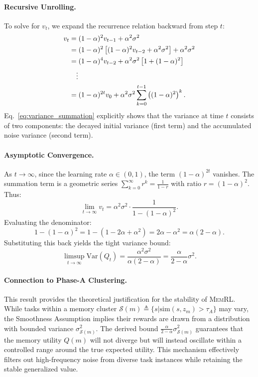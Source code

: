 \documentclass{article}
\theoremstyle{plain}
\theoremstyle{definition}
\theoremstyle{remark}
\begin{document}
\paragraph{Recursive Unrolling.}
To solve for $v_t$, we expand the recurrence relation backward from step $t$:
\begin{align}
    v_t &= (1-\alpha)^2 v_{t-1} + \alpha^2 \sigma^2 \notag \\
    &= (1-\alpha)^2 \left[ (1-\alpha)^2 v_{t-2} + \alpha^2 \sigma^2 \right] + \alpha^2 \sigma^2 \notag \\
    &= (1-\alpha)^4 v_{t-2} + \alpha^2 \sigma^2 \left[ 1 + (1-\alpha)^2 \right] \notag \\
    &\quad \vdots \nonumber \\
    &= (1-\alpha)^{2t} v_0 + \alpha^2 \sigma^2 \sum_{k=0}^{t-1} \left( (1-\alpha)^2 \right)^k. \label{eq:variance_summation}
\end{align}
Eq.~\ref{eq:variance_summation} explicitly shows that the variance at time $t$ consists of two components: the decayed initial variance (first term) and the accumulated noise variance (second term).

\paragraph{Asymptotic Convergence.}
As $t \to \infty$, since the learning rate $\alpha \in (0,1)$, the term $(1-\alpha)^{2t}$ vanishes. The summation term is a geometric series $\sum_{k=0}^{\infty} r^k = \frac{1}{1-r}$ with ratio $r = (1-\alpha)^2$. Thus:
\begin{equation*}
    \lim_{t \to \infty} v_t 
    = \alpha^2 \sigma^2 \cdot \frac{1}{1 - (1-\alpha)^2}.
\end{equation*}
Evaluating the denominator:
\begin{equation*}
    1 - (1-\alpha)^2 = 1 - (1 - 2\alpha + \alpha^2) = 2\alpha - \alpha^2 = \alpha(2-\alpha).
\end{equation*}
Substituting this back yields the tight variance bound:
\begin{equation}
    \limsup_{t \to \infty} \mathrm{Var}(Q_t) 
    = \frac{\alpha^2 \sigma^2}{\alpha(2-\alpha)} 
    = \frac{\alpha}{2-\alpha} \sigma^2.
\end{equation}

\paragraph{Connection to Phase-A Clustering.}
This result provides the theoretical justification for the stability of \textsc{MemRL}. While tasks within a memory cluster $\mathcal{S}(m) \triangleq \{ s | \text{sim}(s, z_m) > \tau_A \}$ may vary, the Smoothness Assumption implies their rewards are drawn from a distribution with bounded variance $\sigma^2_{\mathcal{S}(m)}$.
The derived bound $\frac{\alpha}{2-\alpha} \sigma^2_{\mathcal{S}(m)}$ guarantees that the memory utility $Q(m)$ will not diverge but will instead oscillate within a controlled range around the true expected utility. This mechanism effectively filters out high-frequency noise from diverse task instances while retaining the stable generalized value.
\end{document}

